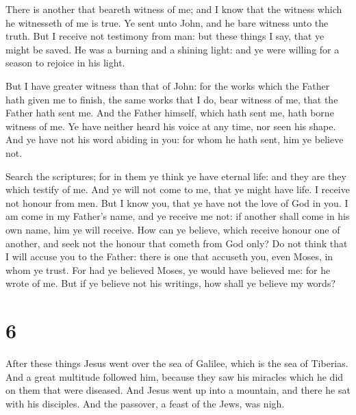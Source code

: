  There is another that beareth witness of me; and I know
that the witness which he witnesseth of me is true.  Ye
sent unto John, and he bare witness unto the truth.  But I
receive not testimony from man: but these things I say, that ye might be
saved.  He was a burning and a shining light: and ye were
willing for a season to rejoice in his light.

 But I have greater witness than that of John: for the
works which the Father hath given me to finish, the same works that I
do, bear witness of me, that the Father hath sent me.  And
the Father himself, which hath sent me, hath borne witness of me. Ye
have neither heard his voice at any time, nor seen his shape.
 And ye have not his word abiding in you: for whom he hath
sent, him ye believe not.

 Search the scriptures; for in them ye think ye have
eternal life: and they are they which testify of me.  And
ye will not come to me, that ye might have life.  I receive
not honour from men.  But I know you, that ye have not the
love of God in you.  I am come in my Father's name, and ye
receive me not: if another shall come in his own name, him ye will
receive.  How can ye believe, which receive honour one of
another, and seek not the honour that cometh from God only?
 Do not think that I will accuse you to the Father: there
is one that accuseth you, even Moses, in whom ye trust. 
For had ye believed Moses, ye would have believed me: for he wrote of
me.  But if ye believe not his writings, how shall ye
believe my words?

\hypertarget{section-5}{%
\section{6}\label{section-5}}

 After these things Jesus went over the sea of Galilee,
which is the sea of Tiberias.  And a great multitude
followed him, because they saw his miracles which he did on them that
were diseased.  And Jesus went up into a mountain, and there
he sat with his disciples.  And the passover, a feast of the
Jews, was nigh.

